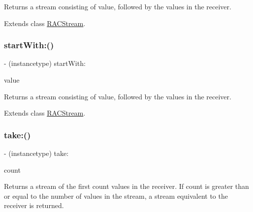 Returns a stream consisting of {\ttfamily value}, followed by the values in the receiver. 

Extends class \mbox{\hyperlink{interface_r_a_c_stream_a2f255fad695085b91a1ebc1e0a78c865}{R\+A\+C\+Stream}}.

\mbox{\label{category_r_a_c_stream_07_operations_08_a2f255fad695085b91a1ebc1e0a78c865}} 
\subsubsection{\texorpdfstring{start\+With\+:()}{startWith:()}\hspace{0.1cm}{\footnotesize\ttfamily [3/3]}}
{\footnotesize\ttfamily -\/ (instancetype) start\+With\+: \begin{DoxyParamCaption}\item[{(id)}]{value }\end{DoxyParamCaption}}

Returns a stream consisting of {\ttfamily value}, followed by the values in the receiver. 

Extends class \mbox{\hyperlink{interface_r_a_c_stream_a2f255fad695085b91a1ebc1e0a78c865}{R\+A\+C\+Stream}}.

\mbox{\label{category_r_a_c_stream_07_operations_08_af0264b38dc4acd9334d2e42b1ce21b05}} 
\subsubsection{\texorpdfstring{take\+:()}{take:()}\hspace{0.1cm}{\footnotesize\ttfamily [1/3]}}
{\footnotesize\ttfamily -\/ (instancetype) take\+: \begin{DoxyParamCaption}\item[{(N\+S\+U\+Integer)}]{count }\end{DoxyParamCaption}}

Returns a stream of the first {\ttfamily count} values in the receiver. If {\ttfamily count} is greater than or equal to the number of values in the stream, a stream equivalent to the receiver is returned. 

